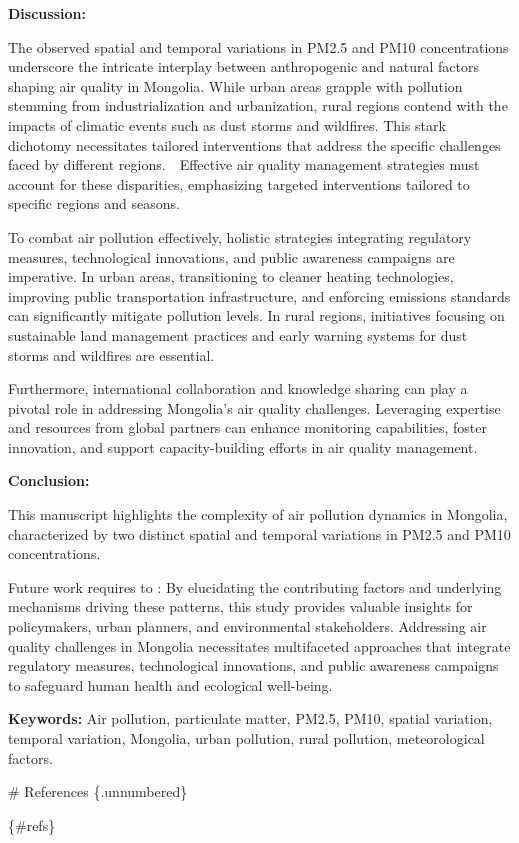 \documentclass[
  number]{elsarticle}
\begin{document}
\textbf{Discussion:}

The observed spatial and temporal variations in PM2.5 and PM10
concentrations underscore the intricate interplay between anthropogenic
and natural factors shaping air quality in Mongolia. While urban areas
grapple with pollution stemming from industrialization and urbanization,
rural regions contend with the impacts of climatic events such as dust
storms and wildfires. This stark dichotomy necessitates tailored
interventions that address the specific challenges faced by different
regions.　Effective air quality management strategies must account for
these disparities, emphasizing targeted interventions tailored to
specific regions and seasons.

To combat air pollution effectively, holistic strategies integrating
regulatory measures, technological innovations, and public awareness
campaigns are imperative. In urban areas, transitioning to cleaner
heating technologies, improving public transportation infrastructure,
and enforcing emissions standards can significantly mitigate pollution
levels. In rural regions, initiatives focusing on sustainable land
management practices and early warning systems for dust storms and
wildfires are essential.

Furthermore, international collaboration and knowledge sharing can play
a pivotal role in addressing Mongolia's air quality challenges.
Leveraging expertise and resources from global partners can enhance
monitoring capabilities, foster innovation, and support
capacity-building efforts in air quality management.

\textbf{Conclusion:}

This manuscript highlights the complexity of air pollution dynamics in
Mongolia, characterized by two distinct spatial and temporal variations
in PM2.5 and PM10 concentrations.

Future work requires to : By elucidating the contributing factors and
underlying mechanisms driving these patterns, this study provides
valuable insights for policymakers, urban planners, and environmental
stakeholders. Addressing air quality challenges in Mongolia necessitates
multifaceted approaches that integrate regulatory measures,
technological innovations, and public awareness campaigns to safeguard
human health and ecological well-being.

\textbf{Keywords:} Air pollution, particulate matter, PM2.5, PM10,
spatial variation, temporal variation, Mongolia, urban pollution, rural
pollution, meteorological factors.

\citep{marrero2019} \# References \{.unnumbered\}

\{\#refs\}


  
\end{document}
